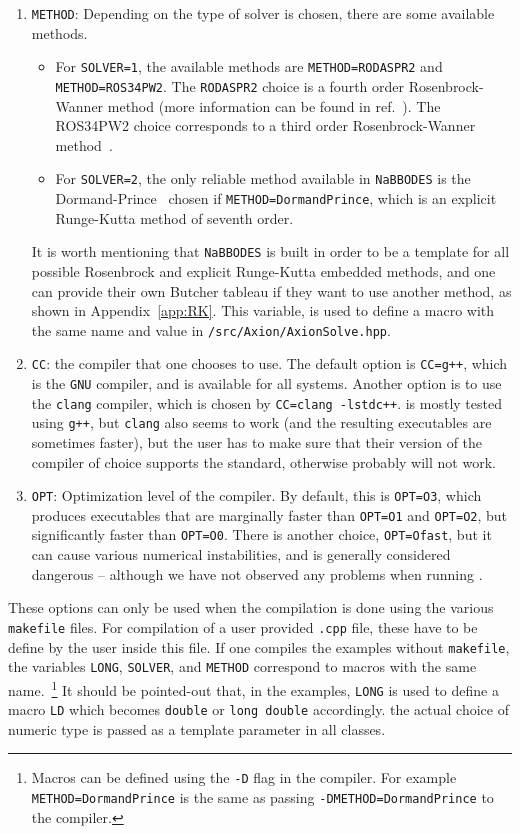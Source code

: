 \documentclass[11pt,a4paper]{article}
\begin{document}
\begin{enumerate}
	\item {\tt METHOD}: Depending on the type of solver is chosen, there are some available methods. 
		\begin{itemize}
			\item 	For {\tt SOLVER=1}, the available methods are 
			{\tt METHOD=RODASPR2} and {\tt METHOD=ROS34PW2}. The {\tt RODASPR2} choice is a fourth order Rosenbrock-Wanner method (more information can be found in ref.~\cite{RANG2015128}). The {ROS34PW2} choice corresponds to a third order Rosenbrock-Wanner method~\cite{RangAngermann2005}. 
			\item 	For {\tt SOLVER=2}, the only reliable method available in {\tt NaBBODES} is the Dormand-Prince~\cite{DORMAND198019} chosen if {\tt METHOD=DormandPrince}, which is an explicit Runge-Kutta method of seventh order.
		\end{itemize}
		It is worth mentioning that {\tt NaBBODES} is built in order to be a template for all possible Rosenbrock and explicit Runge-Kutta embedded methods, and one can provide their own Butcher tableau if they want to use another method, as shown in Appendix~\ref{app:RK}. This variable, is used to define a macro with the same name and value in {\tt \mimes/src/Axion/AxionSolve.hpp}.
	\item {\tt CC}: the \CPP compiler that one chooses to use. The default option is {\tt CC=g++}, which is the {\tt GNU} \CPP compiler, and is available for all systems. Another option is to use the {\tt clang} compiler, which is chosen by {\tt CC=clang -lstdc++}. \mimes is mostly tested using {\tt g++}, but {\tt clang} also seems to work (and the resulting executables are sometimes faster), but the user has to make sure that their version of the compiler of choice supports the  standard, otherwise \mimes probably will not work.
	\item {\tt OPT}: Optimization level of the compiler. By default, this is {\tt OPT=O3}, which produces executables that are marginally faster than {\tt OPT=O1} and {\tt OPT=O2}, but significantly faster than {\tt OPT=O0}. There is another choice, {\tt OPT=Ofast}, but it can cause various numerical instabilities, and is generally considered dangerous -- although we have not observed any problems when running \mimes. 
\end{enumerate}
%
These options can only be used when the compilation is done using the various {\tt makefile} files. For compilation of a user provided {\tt .cpp} file, these have to be define by the user inside this file. If one compiles the examples without {\tt makefile}, the variables {\tt LONG}, {\tt SOLVER}, and {\tt METHOD} correspond to macros with the same name.~\footnote{Macros can be defined using the {\tt -D} flag
in the compiler. For example {\tt METHOD=DormandPrince} is the same as passing {\tt -DMETHOD=DormandPrince} to the compiler.} It should be pointed-out that,  in the examples, {\tt LONG} is used to define a macro {\tt LD} which becomes {\tt double} or {\tt long double} accordingly. the actual choice of numeric type is passed as a template parameter in all classes.
\end{document}
